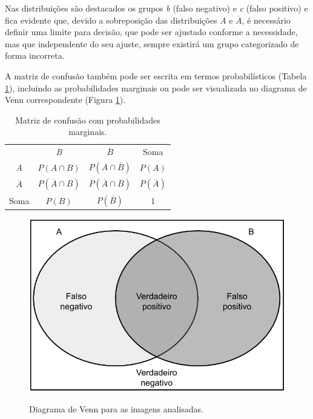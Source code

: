 Nas distribuições são destacados os grupos \textit{b} (falso negativo) e \textit{c} (falso positivo) e fica evidente que, devido a sobreposição das distribuições \textit{A} e $\overline{A}$, é necessário definir uma limite para decisão, que pode ser ajustado conforme a necessidade, mas que independente do seu ajuste, sempre existirá um grupo categorizado de forma incorreta.

A matriz de confusão também pode ser escrita em termos probabilísticos (Tabela \ref{tab:matriz_de_confusao_probab}), incluindo as probabilidades marginais ou pode ser visualizada no diagrama de Venn correspondente (Figura \ref{fig:venn_diagram}).

\begin{table}[htbp]
    \caption{Matriz de confusão com probabilidades marginais.}
    \label{tab:matriz_de_confusao_probab}
    \centering
    \begin{tabular}{cccc}\hline\hline
                       & \textit{B}               & $\overline{B}$                      & Soma              \\
        \textit{A}     & $P(A \cap B)$            & $P(A \cap \overline{B})$            & $P(A)$            \\
        $\overline{A}$ & $P(\overline{A} \cap B)$ & $P(\overline{A} \cap \overline{B})$ & $P(\overline{A})$ \\
        Soma           & $P(B)$                   & $P(\overline{B})$                   & 1                 \\
        \hline\hline
    \end{tabular}
\end{table}

\begin{figure}[htb]
    \centering
    \caption{Diagrama de Venn para as imagens analisadas.}
    \includegraphics[scale=.4]{figs/venn-diagram.png}
    \label{fig:venn_diagram}
\end{figure}

